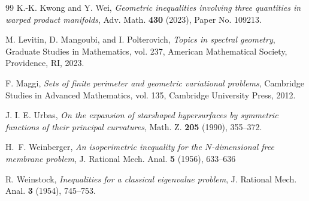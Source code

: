 \documentclass[11pt,reqno]{amsart}
\numberwithin{equation}{section}
\theoremstyle{definition}
\begin{document}
\begin{thebibliography}{99}
K.-K. Kwong and Y. Wei,
\emph{Geometric inequalities involving three quantities in warped product manifolds},
Adv. Math. \textbf{430} (2023), Paper No. 109213.

M. Levitin, D. Mangoubi, and I. Polterovich,
\emph{Topics in spectral geometry},
Graduate Studies in Mathematics, vol. 237, American Mathematical Society, Providence, RI, 2023.

F. Maggi,
\emph{Sets of finite perimeter and geometric variational problems},
Cambridge Studies in Advanced Mathematics, vol. 135, Cambridge University Press, 2012.

J. I. E. Urbas,
\emph{On the expansion of starshaped hypersurfaces by symmetric functions of their principal curvatures},
Math. Z. \textbf{205} (1990), 355--372.

H.~F. Weinberger, \emph{An isoperimetric inequality for the $N$-dimensional free membrane problem}, J. Rational Mech. Anal. {\bf 5} (1956), 633--636

R. Weinstock,
\emph{Inequalities for a classical eigenvalue problem},
J. Rational Mech. Anal. \textbf{3} (1954), 745--753.

\end{thebibliography}
\end{document}
